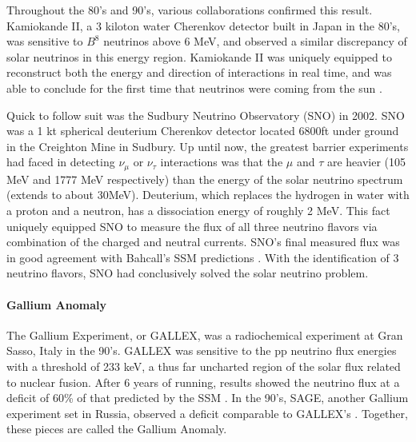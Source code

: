 \par Throughout the 80's and 90's, various collaborations confirmed this result. Kamiokande II, a 3 kiloton water Cherenkov detector built in Japan in the 80's, was sensitive to $B^8$ neutrinos above 6 MeV, and observed a similar discrepancy of solar neutrinos in this energy region. Kamiokande II was uniquely equipped to reconstruct both the energy and direction of interactions in real time, and was able to conclude for the first time that neutrinos were coming from the sun \cite{bib:kam0}. %
\par Quick to follow suit was the Sudbury Neutrino Observatory (SNO) in 2002.  SNO was a 1 kt spherical deuterium Cherenkov detector located 6800ft under ground in the Creighton Mine in Sudbury. Up until now, the greatest barrier experiments had faced in detecting $\nu_\mu$ or $\nu_\tau$ interactions was that the $\mu$ and $\tau$ are heavier (105 MeV and 1777 MeV respectively) than the energy of the solar neutrino spectrum (extends to about 30MeV). Deuterium, which replaces the hydrogen in water with a proton and a neutron, has a dissociation energy of roughly 2 MeV. This fact uniquely equipped SNO to measure the flux of all three neutrino flavors via combination of the charged and neutral currents. SNO's final measured flux was in good agreement with Bahcall's SSM predictions \cite{bib:sno}.  With the identification of 3 neutrino flavors, SNO had conclusively solved the solar neutrino problem.  
\paragraph{Gallium Anomaly} The Gallium Experiment, or GALLEX, was a radiochemical experiment at Gran Sasso, Italy in the 90's. GALLEX was sensitive to the pp neutrino flux energies with a threshold of 233 keV, a thus far uncharted region of the solar flux related to nuclear fusion. After 6 years of running, results showed the neutrino flux at a deficit of 60\% of that predicted by the SSM \cite{bib:gal0}. In the 90's, SAGE, another Gallium experiment set in Russia, observed a deficit comparable to GALLEX's \cite{bib:sage}.  Together, these pieces are called the Gallium Anomaly.  

